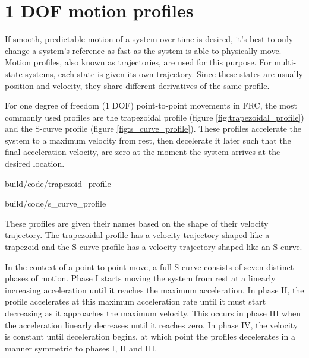 
\chapter{1 DOF motion profiles}
\label{ch:1_dof_motion_profiles}

If smooth, predictable motion of a \gls{system} over time is desired, it's best
to only change a \gls{system}'s \gls{reference} as fast as the \gls{system} is
able to physically move. Motion profiles, also known as trajectories, are used
for this purpose. For multi-state \glspl{system}, each \gls{state} is given its
own trajectory. Since these \glspl{state} are usually position and velocity,
they share different derivatives of the same profile.

For one degree of freedom ($1$ DOF) point-to-point movements in FRC, the most
commonly used profiles are the trapezoidal profile (figure
\ref{fig:trapezoidal_profile}) and the S-curve profile (figure
\ref{fig:s_curve_profile}). These profiles accelerate the \gls{system} to a
maximum velocity from rest, then decelerate it later such that the final
acceleration velocity, are zero at the moment the \gls{system} arrives at the
desired location.

\begin{bookfigure}
  \begin{minisvg}{2}{build/code/trapezoid_profile}
    \caption{Trapezoidal profile}
    \label{fig:trapezoidal_profile}
  \end{minisvg}
  \hfill
  \begin{minisvg}{2}{build/code/s_curve_profile}
    \caption{S-curve profile}
    \label{fig:s_curve_profile}
  \end{minisvg}
\end{bookfigure}

These profiles are given their names based on the shape of their velocity
trajectory. The trapezoidal profile has a velocity trajectory shaped like a
trapezoid and the S-curve profile has a velocity trajectory shaped like an
S-curve.

In the context of a point-to-point move, a full S-curve consists of seven
distinct phases of motion. Phase I starts moving the \gls{system} from rest at a
linearly increasing acceleration until it reaches the maximum acceleration. In
phase II, the profile accelerates at this maximum acceleration rate until it
must start decreasing as it approaches the maximum velocity. This occurs in
phase III when the acceleration linearly decreases until it reaches zero. In
phase IV, the velocity is constant until deceleration begins, at which point the
profiles decelerates in a manner symmetric to phases I, II and III.

